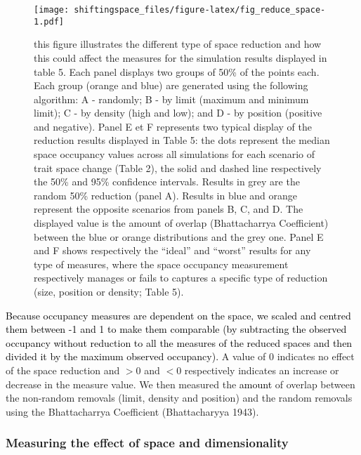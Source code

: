 \documentclass[]{article}
\begin{document}
\renewcommand\baselinestretch{1}\selectfont

\begin{figure}
\centering
\texttt{[image: shiftingspace\_files/figure-latex/fig\_reduce\_space-1.pdf]}
\caption{\small{this figure illustrates the different type of space
reduction and how this could affect the measures for the simulation
results displayed in table 5. Each panel displays two groups of 50\% of
the points each. Each group (orange and blue) are generated using the
following algorithm: A - randomly; B - by limit (maximum and minimum
limit); C - by density (high and low); and D - by position (positive and
negative). Panel E et F represents two typical display of the reduction
results displayed in Table 5: the dots represent the median space
occupancy values across all simulations for each scenario of trait space
change (Table 2), the solid and dashed line respectively the 50\% and
95\% confidence intervals. Results in grey are the random 50\% reduction
(panel A). Results in blue and orange represent the opposite scenarios
from panels B, C, and D. The displayed value is the amount of overlap
(Bhattacharrya Coefficient) between the blue or orange distributions and
the grey one. Panel E and F shows respectively the ``ideal'' and
``worst'' results for any type of measures, where the space occupancy
measurement respectively manages or fails to captures a specific type of
reduction (size, position or density; Table 5).}}
\end{figure}

\renewcommand\baselinestretch{1.6}\selectfont


\textcolor{black}{Because occupancy measures are dependent on the space, we scaled and centred them between -1 and 1 to make them comparable (by subtracting the observed occupancy without reduction to all the measures of the reduced spaces and then divided it by the maximum observed occupancy).}
A value of 0 indicates no effect of the space reduction and \(>0\) and
\(<0\) respectively indicates an increase or decrease in the measure
value. We then measured the \textcolor{black}{amount} of
overlap between the non-random removals (limit, density and position)
and the random removals using the Bhattacharrya Coefficient
(Bhattacharyya 1943).

\subsubsection{Measuring the effect of space and
dimensionality}\label{measuring-the-effect-of-space-and-dimensionality}
\end{document}
